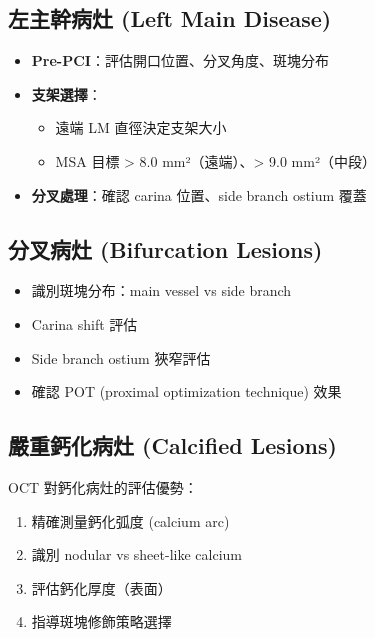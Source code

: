 \documentclass[12pt,a4paper]{article}
\begin{document}
\subsection{左主幹病灶 (Left Main Disease)}

\begin{itemize}
    \item \textbf{Pre-PCI}：評估開口位置、分叉角度、斑塊分布
    \item \textbf{支架選擇}：
    \begin{itemize}
        \item 遠端 LM 直徑決定支架大小
        \item MSA 目標 > 8.0 mm²（遠端）、> 9.0 mm²（中段）
    \end{itemize}
    \item \textbf{分叉處理}：確認 carina 位置、side branch ostium 覆蓋
\end{itemize}

\subsection{分叉病灶 (Bifurcation Lesions)}

\begin{itemize}
    \item 識別斑塊分布：main vessel vs side branch
    \item Carina shift 評估
    \item Side branch ostium 狹窄評估
    \item 確認 POT (proximal optimization technique) 效果
\end{itemize}

\subsection{嚴重鈣化病灶 (Calcified Lesions)}

OCT 對鈣化病灶的評估優勢：
\begin{enumerate}
    \item 精確測量鈣化弧度 (calcium arc)
    \item 識別 nodular vs sheet-like calcium
    \item 評估鈣化厚度（表面）
    \item 指導斑塊修飾策略選擇
\end{enumerate}
\end{document}
